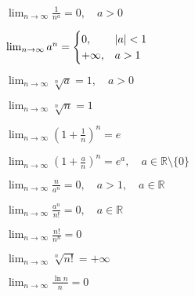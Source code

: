 \begin{minipage}[t]{0.45\textwidth}
  \begin{myitemize}
    \item $ \lim_{n\to \infty} \frac{1}{n^{a}} = 0, \quad  a > 0 $ 
    \item $ \lim_{n\to \infty} a^{n} =
      \begin{cases} 
        0, &  \abs{a} < 1 \\
        +\infty, & a>1 
      \end{cases}$
    \item $ \lim_{n\to \infty} \sqrt[n]{a} = 1, \quad  a>0 $
    \item $ \lim_{n\to \infty} \sqrt[n]{n} = 1 $
    \item $ \lim_{n\to \infty} \left(1 + \frac{1}{n}\right)^{n} = e $
    \item $ \lim_{n\to \infty} \left(1 + \frac{a}{n}\right)^{n} = e^{a}, 
      \quad a \in \mathbb{R} \setminus \{0\} $
    \item $ \lim_{n\to \infty} \frac{n}{a^{n}} = 0, \quad  a>1, \quad a \in \mathbb{R} $
    \item $ \lim_{n\to \infty} \frac{a^{n}}{n!} = 0, \quad  a \in \mathbb{R} $
    \item $ \lim_{n\to \infty} \frac{n!}{n^{n}} = 0 $
    \item $ \lim_{n\to \infty} \sqrt[n]{n!} = + \infty $
    \item $ \lim_{n\to \infty} \frac{\ln n}{n} = 0 $
  \end{myitemize}
\end{minipage}



